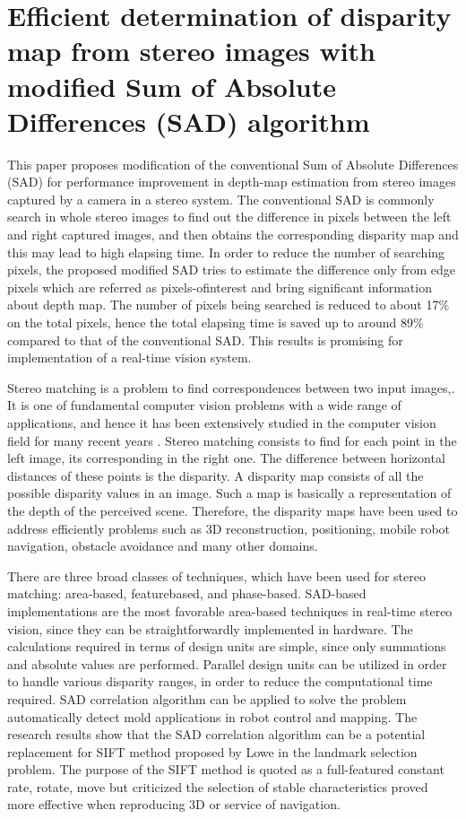 
\chapter{Efficient determination of disparity map from
stereo images with modified Sum of Absolute
Differences (SAD) algorithm}

This paper proposes modification of the
conventional Sum of Absolute Differences (SAD) for performance
improvement in depth-map estimation from stereo images
captured by a camera in a stereo system. The conventional SAD
is commonly search in whole stereo images to find out the
difference in pixels between the left and right captured images,
and then obtains the corresponding disparity map and this may
lead to high elapsing time. In order to reduce the number of
searching pixels, the proposed modified SAD tries to estimate the
difference only from edge pixels which are referred as pixels-ofinterest
and bring significant information about depth map. The
number of pixels being searched is reduced to about 17\% on the
total pixels, hence the total elapsing time is saved up to around
89\% compared to that of the conventional SAD. This results is
promising for implementation of a real-time vision system.

Stereo matching is a problem to find correspondences
between two input images,. It is one of fundamental
computer vision problems with a wide range of applications,
and hence it has been extensively studied in the computer
vision field for many recent years . Stereo matching consists to
find for each point in the left image, its corresponding in the
right one. The difference between horizontal distances of these
points is the disparity. A disparity map consists of all the
possible disparity values in an image. Such a map is basically
a representation of the depth of the perceived scene. Therefore,
the disparity maps have been used to address efficiently
problems such as 3D reconstruction, positioning, mobile robot
navigation, obstacle avoidance and many other domains.

There are three broad classes of techniques, which have
been used for stereo matching: area-based, featurebased, and phase-based. SAD-based implementations
are the most favorable area-based techniques in real-time
stereo vision, since they can be straightforwardly implemented
in hardware. The calculations required in terms of design units
are simple, since only summations and absolute values are
performed. Parallel design units can be utilized in order to
handle various disparity ranges, in order to reduce the
computational time required. SAD correlation algorithm
can be applied to solve the problem automatically detect mold
applications in robot control and mapping. The research
results show that the SAD correlation algorithm can be a
potential replacement for SIFT method proposed by Lowe in the landmark selection problem. The purpose of the
SIFT method is quoted as a full-featured constant rate,
rotate, move but criticized the selection of stable
characteristics proved more effective when reproducing 3D or
service of navigation.

